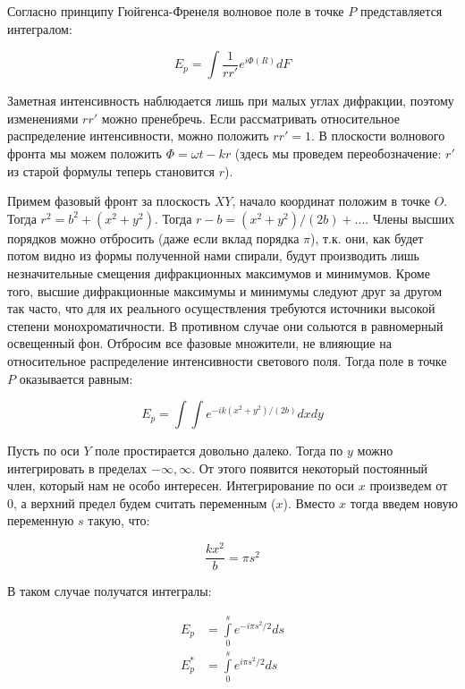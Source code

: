 Согласно принципу Гюйгенса-Френеля волновое поле в точке $P$ представляется интегралом:

\begin{equation*}
	E_p = \int \frac{1}{r r'} e^{i \Phi(R)} d F
\end{equation*}

Заметная интенсивность наблюдается лишь при малых углах дифракции, поэтому изменениями $r r'$ можно пренебречь. Если рассматривать относительное распределение интенсивности, можно положить $r r' = 1$. В плоскости волнового фронта мы можем положить $\Phi = \omega t - k r$ (здесь мы проведем переобозначение: $r'$ из старой формулы теперь становится $r$).

Примем фазовый фронт за плоскость $XY$, начало координат положим в точке $O$. Тогда $r^2 = b^2 + (x^2 + y^2)$. Тогда $r - b = (x^2 + y^2) / (2 b) + ...$. Члены высших порядков можно отбросить (даже если вклад порядка $\pi$), т.к. они, как будет потом видно из формы полученной нами спирали, будут производить лишь незначительные смещения дифракционных максимумов и минимумов. Кроме того, высшие дифракционные максимумы и минимумы следуют друг за другом так часто, что для их реального осуществления требуются источники высокой степени монохроматичности. В противном случае они сольются в равномерный освещенный фон. Отбросим все фазовые множители, не влияющие на относительное распределение интенсивности светового поля. Тогда поле в точке $P$ оказывается равным:

\begin{equation*}
	E_p = \int \int e ^{- i k (x^2 + y^2) / (2 b)} dx dy
\end{equation*}

Пусть по оси $Y$ поле простирается довольно далеко. Тогда по $y$ можно интегрировать в пределах $-\infty, \infty$. От этого появится некоторый постоянный член, который нам не особо интересен. Интегрирование по оси $x$ произведем от 0, а верхний предел будем считать переменным ($x$). Вместо $x$ тогда введем новую переменную $s$ такую, что:

\begin{equation*}
	\frac{k x^2}{b} = \pi s^2
\end{equation*}

В таком случае получатся интегралы:

\begin{align*}
	E_p &= \int \limits_0^s e^{- i \pi s^2 / 2} d s \\
	E_p^* &= \int \limits_0^s e^{i \pi s^2 / 2} d s 
\end{align*}

